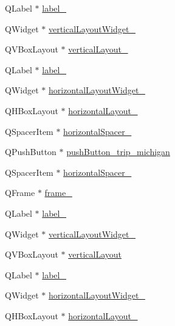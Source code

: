 \begin{DoxyCompactItemize}
\item 
Q\+Label $\ast$ \hyperlink{class_ui___main_window_ad6bab8fb8903b8f41afea1218ee52695}{label\+\_}
\item 
Q\+Widget $\ast$ \hyperlink{class_ui___main_window_a8c712b1981812dfef6ad80a9665c2b6b}{vertical\+Layout\+Widget\+\_}
\item 
Q\+V\+Box\+Layout $\ast$ \hyperlink{class_ui___main_window_a6f40fc110b15410c00837a446d57bdbe}{vertical\+Layout\+\_}
\item 
Q\+Label $\ast$ \hyperlink{class_ui___main_window_a1c16c0a684617927472e534822a63c7d}{label\+\_}
\item 
Q\+Widget $\ast$ \hyperlink{class_ui___main_window_af0e568930a59b389034cb1b1b9923430}{horizontal\+Layout\+Widget\+\_}
\item 
Q\+H\+Box\+Layout $\ast$ \hyperlink{class_ui___main_window_a8ead8fc876ee91c30864822eedb9c370}{horizontal\+Layout\+\_}
\item 
Q\+Spacer\+Item $\ast$ \hyperlink{class_ui___main_window_acdff0826006698f82a7ef284f2950409}{horizontal\+Spacer\+\_}
\item 
Q\+Push\+Button $\ast$ \hyperlink{class_ui___main_window_aa0700d5073a4297284eb9f383e44b672}{push\+Button\+\_\+trip\+\_\+michigan}
\item 
Q\+Spacer\+Item $\ast$ \hyperlink{class_ui___main_window_a100e0ffd031f76754eba5078288deabf}{horizontal\+Spacer\+\_}
\item 
Q\+Frame $\ast$ \hyperlink{class_ui___main_window_aed0f5b9668c2707de5fdab4f1339e1f2}{frame\+\_}
\item 
Q\+Label $\ast$ \hyperlink{class_ui___main_window_a663f728e6244926a795c6e6892673b1d}{label\+\_}
\item 
Q\+Widget $\ast$ \hyperlink{class_ui___main_window_a62b94f49d79e473da0f96d804b9c3af7}{vertical\+Layout\+Widget\+\_}
\item 
Q\+V\+Box\+Layout $\ast$ \hyperlink{class_ui___main_window_aecd96a04789fcfec3f98d80390ad8184}{vertical\+Layout}
\item 
Q\+Label $\ast$ \hyperlink{class_ui___main_window_a4f12a71b4a2fb6f85df2300d83b5ed3e}{label\+\_}
\item 
Q\+Widget $\ast$ \hyperlink{class_ui___main_window_a8e334623cc10855cd50899aefda3edcf}{horizontal\+Layout\+Widget\+\_}
\item 
Q\+H\+Box\+Layout $\ast$ \hyperlink{class_ui___main_window_af1a7bbeee705545b94c55c297299118d}{horizontal\+Layout\+\_}
\item 

\end{DoxyCompactItemize}
